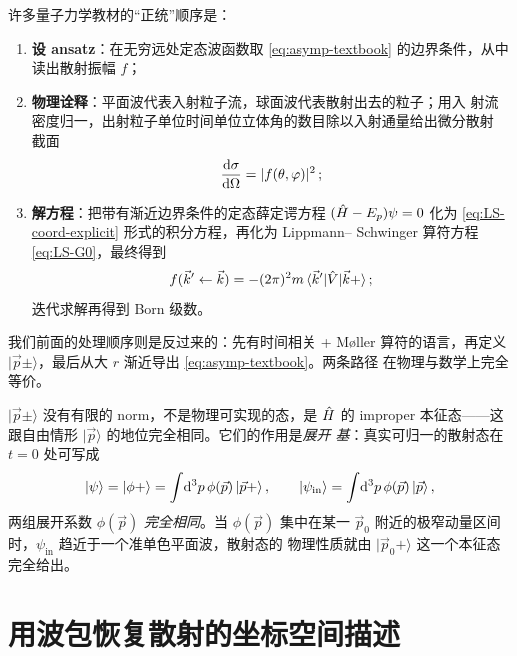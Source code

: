 许多量子力学教材的``正统''顺序是：
\begin{enumerate}
  \item \textbf{设 ansatz}：在无穷远处定态波函数取
        \eqref{eq:asymp-textbook} 的边界条件，从中读出散射振幅 $f$；
  \item \textbf{物理诠释}：平面波代表入射粒子流，球面波代表散射出去的粒子；用入
        射流密度归一，出射粒子单位时间单位立体角的数目除以入射通量给出微分散射
        截面
        \begin{equation}
          \frac{\mathrm{d}\sigma}{\mathrm{d}\Omega} = |f(\theta,\varphi)|^2\,;
          \label{eq:dsig-dOmega}
        \end{equation}
  \item \textbf{解方程}：把带有渐近边界条件的定态薛定谔方程 $(\hat{H}-E_p)\psi=0$
        化为 \eqref{eq:LS-coord-explicit} 形式的积分方程，再化为 Lippmann--
        Schwinger 算符方程 \eqref{eq:LS-G0}，最终得到
        \begin{equation}
          f(\vec k'\leftarrow\vec k) = -(2\pi)^2 m\,\langle\vec k'|\hat{V}|\vec k+\rangle\,;
        \end{equation}
        迭代求解再得到 Born 级数。
\end{enumerate}

我们前面的处理顺序则是反过来的：先有时间相关 + M\o ller 算符的语言，再定义
$|\vec p\pm\rangle$，最后从大 $r$ 渐近导出 \eqref{eq:asymp-textbook}。两条路径
在物理与数学上完全等价。

\begin{remark}
$|\vec p\pm\rangle$ 没有有限的 norm，不是物理可实现的态，是 $\hat{H}$ 的 improper
本征态——这跟自由情形 $|\vec p\rangle$ 的地位完全相同。它们的作用是\emph{展开
基}：真实可归一的散射态在 $t=0$ 处可写成
\begin{equation}
  |\psi\rangle = |\phi+\rangle = \int\!\mathrm{d}^3p\,\phi(\vec p)\,|\vec p+\rangle\,,
  \qquad
  |\psi_{\text{in}}\rangle = \int\!\mathrm{d}^3p\,\phi(\vec p)\,|\vec p\rangle\,,
\end{equation}
两组展开系数 $\phi(\vec p)$ \emph{完全相同}。当 $\phi(\vec p)$ 集中在某一 $\vec
p_0$ 附近的极窄动量区间时，$\psi_{\text{in}}$ 趋近于一个准单色平面波，散射态的
物理性质就由 $|\vec p_0+\rangle$ 这一个本征态完全给出。
\end{remark}

\section{用波包恢复散射的坐标空间描述}

